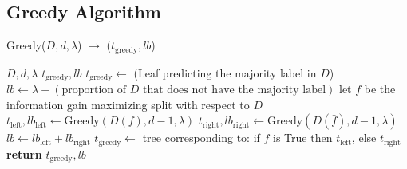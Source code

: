 \subsection{Greedy Algorithm}\label{sec:greedy_alg}
\begin{algorithm}[H]
\caption{Greedy($D, d, \lambda$) $\to$ ($t_{\textrm{greedy}}, lb$)}
\label{alg:greedy}
\begin{algorithmic}[1]
\REQUIRE $D, d, \lambda$ 
\ENSURE $t_{\textrm{greedy}}, lb$ \COMMENT{\textcolor{commentgreen}{tree grown with a greedy, CART-style method; and the objective of that tree}}
\STATE $t_{\textrm{greedy}} \gets $ \textrm{(Leaf predicting the majority label in $D$)} 
\STATE $lb \gets \lambda + (\textrm{proportion of $D$ that does not have the majority label})$
\STATE let $f$ be the information gain maximizing split with respect to $D$ 
\STATE $t_{\textrm{left}}, lb_{\textrm{left}} \gets \textrm{Greedy}(D(f), d - 1, \lambda)$
\STATE $t_{\textrm{right}}, lb_{\textrm{right}} \gets \textrm{Greedy}(D(\bar{f}), d - 1, \lambda)$
\STATE $lb \gets lb_{\textrm{left}} + lb_{\textrm{right}}$ 
\STATE $t_\textrm{greedy} \gets$ \textrm{tree corresponding to: if $f$ is True then $t_{\textrm{left}}$, else $t_{\textrm{right}}$}
\ENDIF
\ENDIF
\STATE \textbf{return} $t_{\textrm{greedy}}, lb$
\end{algorithmic}
\end{algorithm}


